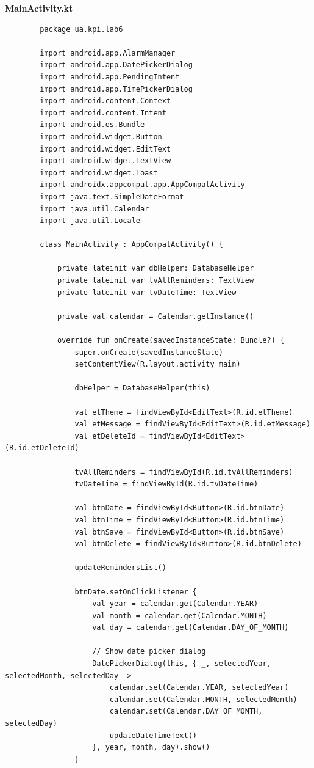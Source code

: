 \documentclass[14pt, a4paper]{extreport}
\begin{document}
	\textbf{MainActivity.kt}
	
	\begin{verbatim} 
		package ua.kpi.lab6
		
		import android.app.AlarmManager
		import android.app.DatePickerDialog
		import android.app.PendingIntent
		import android.app.TimePickerDialog
		import android.content.Context
		import android.content.Intent
		import android.os.Bundle
		import android.widget.Button
		import android.widget.EditText
		import android.widget.TextView
		import android.widget.Toast
		import androidx.appcompat.app.AppCompatActivity
		import java.text.SimpleDateFormat
		import java.util.Calendar
		import java.util.Locale
		
		class MainActivity : AppCompatActivity() {
			
			private lateinit var dbHelper: DatabaseHelper
			private lateinit var tvAllReminders: TextView
			private lateinit var tvDateTime: TextView
			
			private val calendar = Calendar.getInstance()
			
			override fun onCreate(savedInstanceState: Bundle?) {
				super.onCreate(savedInstanceState)
				setContentView(R.layout.activity_main)
				
				dbHelper = DatabaseHelper(this)
				
				val etTheme = findViewById<EditText>(R.id.etTheme)
				val etMessage = findViewById<EditText>(R.id.etMessage)
				val etDeleteId = findViewById<EditText>(R.id.etDeleteId)
				
				tvAllReminders = findViewById(R.id.tvAllReminders)
				tvDateTime = findViewById(R.id.tvDateTime)
				
				val btnDate = findViewById<Button>(R.id.btnDate)
				val btnTime = findViewById<Button>(R.id.btnTime)
				val btnSave = findViewById<Button>(R.id.btnSave)
				val btnDelete = findViewById<Button>(R.id.btnDelete)
				
				updateRemindersList()
				
				btnDate.setOnClickListener {
					val year = calendar.get(Calendar.YEAR)
					val month = calendar.get(Calendar.MONTH)
					val day = calendar.get(Calendar.DAY_OF_MONTH)
					
					// Show date picker dialog
					DatePickerDialog(this, { _, selectedYear, selectedMonth, selectedDay ->
						calendar.set(Calendar.YEAR, selectedYear)
						calendar.set(Calendar.MONTH, selectedMonth)
						calendar.set(Calendar.DAY_OF_MONTH, selectedDay)
						updateDateTimeText()
					}, year, month, day).show()
				}
				

\end{verbatim}
\end{document}
